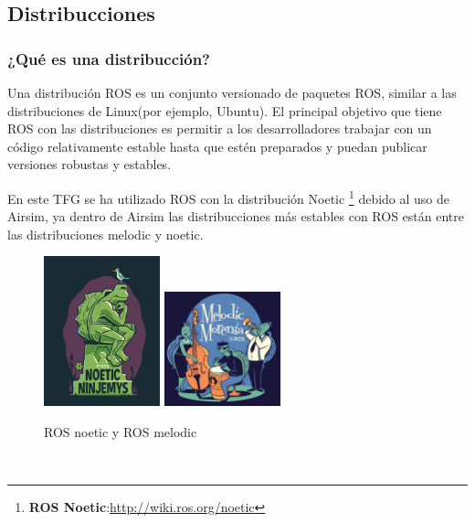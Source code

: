 \subsection{Distribucciones}
\label{sec:dis}
\subsubsection{¿Qué es una distribucción?}
\label{subsubsec:q_dis}
Una distribución ROS es un conjunto versionado de paquetes ROS, similar a las distribuciones de Linux(por ejemplo, Ubuntu). El principal objetivo que tiene ROS con las distribuciones 
es permitir a los desarrolladores trabajar con un código relativamente estable hasta que estén preparados y puedan publicar versiones robustas y estables. \newline

En este TFG se ha utilizado ROS con la distribución Noetic \footnote{\textbf{ROS Noetic}:\url{http://wiki.ros.org/noetic}} debido al uso de Airsim, 
ya dentro de Airsim las distribucciones más estables con ROS están entre las distribuciones melodic y noetic. 

\begin{figure} [H]
    \begin{center}
      \includegraphics[width=0.3\textwidth,height=0.4\textwidth]{figs/Plataformas_Desarollo/ros-noetic.png}
      \includegraphics[width=0.3\textwidth,height=0.4\textwidth]{figs/Plataformas_Desarollo/melodic.jpg}
    \end{center}
    \caption{ROS noetic y ROS melodic}
    \label{fig:DisROS}
  \end{figure}\

